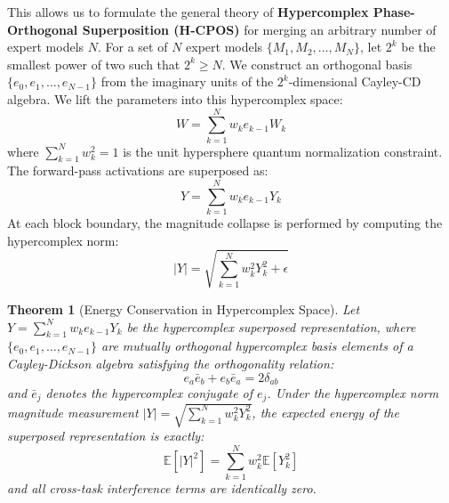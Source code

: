 \documentclass{article}
\theoremstyle{plain}
\newtheorem{theorem}{Theorem}[section]
\theoremstyle{definition}
\theoremstyle{remark}
\begin{document}
This allows us to formulate the general theory of \textbf{Hypercomplex Phase-Orthogonal Superposition (H-CPOS)} for merging an arbitrary number of expert models $N$. For a set of $N$ expert models $\{M_1, M_2, \dots, M_N\}$, let $2^k$ be the smallest power of two such that $2^k \ge N$. We construct an orthogonal basis $\{e_0, e_1, \dots, e_{N-1}\}$ from the imaginary units of the $2^k$-dimensional Cayley-CD algebra. We lift the parameters into this hypercomplex space:
\begin{equation}
W = \sum_{k=1}^N w_k e_{k-1} W_k
\end{equation}
where $\sum_{k=1}^N w_k^2 = 1$ is the unit hypersphere quantum normalization constraint. The forward-pass activations are superposed as:
\begin{equation}
Y = \sum_{k=1}^N w_k e_{k-1} Y_k
\end{equation}
At each block boundary, the magnitude collapse is performed by computing the hypercomplex norm:
\begin{equation}
|Y| = \sqrt{\sum_{k=1}^N w_k^2 Y_k^2 + \epsilon}
\end{equation}

\begin{theorem}[Energy Conservation in Hypercomplex Space]
Let $Y = \sum_{k=1}^N w_k e_{k-1} Y_k$ be the hypercomplex superposed representation, where $\{e_0, e_1, \dots, e_{N-1}\}$ are mutually orthogonal hypercomplex basis elements of a Cayley-Dickson algebra satisfying the orthogonality relation:
\begin{equation}
e_a \bar{e}_b + e_b \bar{e}_a = 2 \delta_{ab}
\end{equation}
and $\bar{e}_j$ denotes the hypercomplex conjugate of $e_j$. Under the hypercomplex norm magnitude measurement $|Y| = \sqrt{\sum_{k=1}^N w_k^2 Y_k^2}$, the expected energy of the superposed representation is exactly:
\begin{equation}
\mathbb{E}[|Y|^2] = \sum_{k=1}^N w_k^2 \mathbb{E}[Y_k^2]
\end{equation}
and all cross-task interference terms are identically zero.
\end{theorem}
\end{document}

